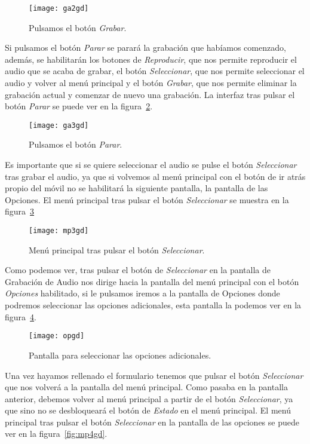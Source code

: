 \begin{figure}[htb]
	\centering
	\texttt{[image: ga2gd]}
	\caption{Pulsamos el botón \textit{Grabar}.}
	\label{fig:ga2gd}
\end{figure}

Si pulsamos el botón \textit{Parar} se parará la grabación que habíamos comenzado, además, se habilitarán los botones de \textit{Reproducir},  que nos permite reproducir el audio que se acaba de grabar, el botón \textit{Seleccionar}, que nos permite seleccionar el audio y volver al menú principal y el botón \textit{Grabar}, que nos permite eliminar la grabación actual y comenzar de nuevo una grabación. La interfaz tras pulsar el botón \textit{Parar} se puede ver en la figura~\ref{fig:ga3gd}.

\begin{figure}[H]
	\centering
	\texttt{[image: ga3gd]}
	\caption{Pulsamos el botón \textit{Parar}.}
	\label{fig:ga3gd}
\end{figure}

Es importante que si se quiere seleccionar el audio se pulse el botón \textit{Seleccionar} tras grabar el audio, ya que si volvemos al menú principal con el botón de ir atrás propio del móvil no se habilitará la siguiente pantalla, la pantalla de las Opciones. El menú principal tras pulsar el botón \textit{Seleccionar} se muestra en la figura~\ref{fig:mp3gd}

\begin{figure}
	\centering
	\texttt{[image: mp3gd]}
	\caption{Menú principal tras pulsar el botón \textit{Seleccionar}.}
	\label{fig:mp3gd}
\end{figure}

Como podemos ver, tras pulsar el botón de \textit{Seleccionar} en la pantalla de Grabación de Audio nos dirige hacia la pantalla del menú principal con el botón \textit{Opciones} habilitado, si le pulsamos iremos a la pantalla de Opciones donde podremos seleccionar las opciones adicionales, esta pantalla la podemos ver en la figura~\ref{fig:opgd}.

\begin{figure}[H]
	\centering
	\texttt{[image: opgd]}
	\caption{Pantalla para seleccionar las opciones adicionales.}
	\label{fig:opgd}
\end{figure}

Una vez hayamos rellenado el formulario tenemos que pulsar el botón \textit{Seleccionar} que nos volverá a la pantalla del menú principal. Como pasaba en la pantalla anterior, debemos volver al menú principal a partir de el botón \textit{Seleccionar}, ya que sino no se desbloqueará el botón de \textit{Estado} en el menú principal. El menú principal tras pulsar el botón \textit{Seleccionar} en la pantalla de las opciones se puede ver en la figura~\ref{fig:mp4gd}.

